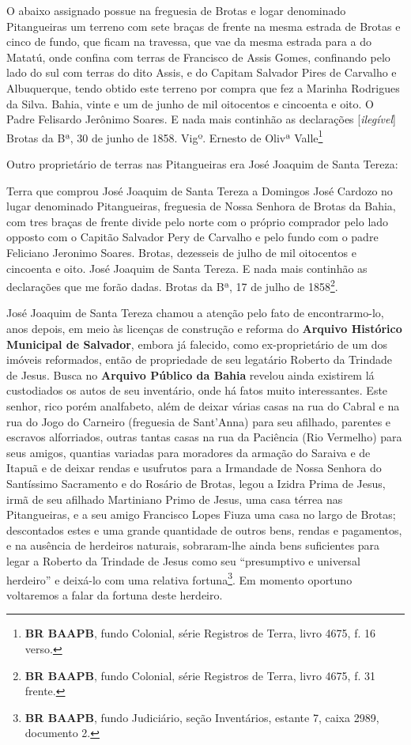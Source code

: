 \begin{citacao}
O abaixo assignado possue na freguesia de Brotas e logar denominado Pitangueiras um terreno com sete braças de frente na mesma estrada de Brotas e cinco de fundo, que ficam na travessa, que vae da mesma estrada para a do Matatú, onde confina com terras de Francisco de Assis Gomes, confinando pelo lado do sul com terras do dito Assis, e do Capitam Salvador Pires de Carvalho e Albuquerque, tendo obtido este terreno por compra que fez a Marinha Rodrigues da Silva. Bahia, vinte e um de junho de mil oitocentos e cincoenta e oito. O Padre Felisardo Jerônimo Soares. E nada mais continhão as declarações [\textit{ilegível}] Brotas da Bª, 30 de junho de 1858. 
Vigº. Ernesto de Olivª Valle\footnote{\textbf{BR BAAPB}, fundo Colonial, série Registros de Terra, livro 4675, f. 16 verso.}
\end{citacao}

Outro proprietário de terras nas Pitangueiras era José Joaquim de Santa Tereza:

\begin{citacao}
Terra que comprou José Joaquim de Santa Tereza a Domingos José Cardozo no lugar denominado Pitangueiras, freguesia de Nossa Senhora de Brotas da Bahia, com tres braças de frente divide pelo norte com o próprio comprador pelo lado opposto com o Capitão Salvador Pery de Carvalho e pelo fundo com o padre Feliciano Jeronimo Soares. Brotas, dezesseis de julho de mil oitocentos e cincoenta e oito. José Joaquim de Santa Tereza. E nada mais continhão as declarações que me forão dadas. Brotas da Bª, 17 de julho de 1858\footnote{\textbf{BR BAAPB}, fundo Colonial, série Registros de Terra, livro 4675, f. 31 frente.}.
\end{citacao}

José Joaquim de Santa Tereza chamou a atenção pelo fato de encontrarmo-lo, anos depois, em meio às licenças de construção e reforma do \textbf{Arquivo Histórico Municipal de Salvador}, embora já falecido, como ex-proprietário de um dos imóveis reformados, então de propriedade de seu legatário Roberto da Trindade de Jesus. Busca no \textbf{Arquivo Público da Bahia} revelou ainda existirem lá custodiados os autos de seu inventário, onde há fatos muito interessantes. Este senhor, rico porém analfabeto, além de deixar várias casas na rua do Cabral e na rua do Jogo do Carneiro (freguesia de Sant'Anna) para seu afilhado, parentes e escravos alforriados, outras tantas casas na rua da Paciência (Rio Vermelho) para seus amigos, quantias variadas para moradores da armação do Saraiva e de Itapuã e de deixar rendas e usufrutos para a Irmandade de Nossa Senhora do Santíssimo Sacramento e do Rosário de Brotas, legou a Izidra Prima de Jesus, irmã de seu afilhado Martiniano Primo de Jesus, uma casa térrea nas Pitangueiras, e a seu amigo Francisco Lopes Fiuza uma casa no largo de Brotas; descontados estes e uma grande quantidade de outros bens, rendas e pagamentos, e na ausência de herdeiros naturais, sobraram-lhe ainda bens suficientes para legar a Roberto da Trindade de Jesus como seu ``presumptivo e universal herdeiro'' e deixá-lo com uma relativa fortuna\footnote{\textbf{BR BAAPB}, fundo Judiciário, seção Inventários, estante 7, caixa 2989, documento 2.}. Em momento oportuno voltaremos a falar da fortuna deste herdeiro. 

